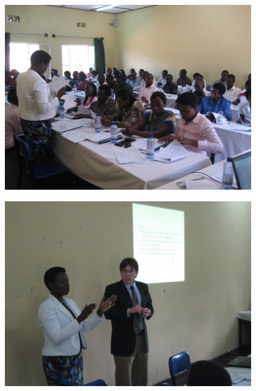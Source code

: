 \documentclass[aspectratio=169]{beamer}
\begin{document}
\begin{frame}

\begin{center}
\includegraphics[width=0.8\textwidth]{figures/rwanda_interviewer_class.jpg}
\end{center}

\end{frame}
\begin{frame}

\begin{center}
\includegraphics[width=0.8\textwidth]{figures/rwanda_matt_teaching.jpg}
\end{center}

\end{frame}
\end{document}
